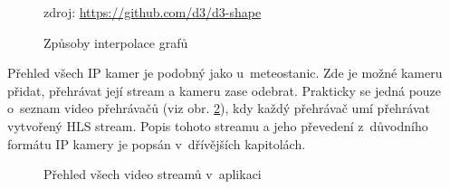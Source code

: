 \begin{figure}[h]
	\centering
	\caption{Způsoby interpolace grafů}
	\small zdroj: \url{https://github.com/d3/d3-shape}
	\label{fig:app:interpolation}
\end{figure}

Přehled všech IP kamer je podobný jako u~meteostanic. Zde je možné kameru přidat, přehrávat její stream a kameru zase odebrat. Prakticky se jedná pouze o~seznam video přehrávačů (viz obr. \ref{fig:app:cameras}), kdy každý přehrávač umí přehrávat vytvořený HLS stream. Popis tohoto streamu a jeho převedení z~důvodního formátu IP kamery je popsán v~dřívějších kapitolách.

\begin{figure}[h]
	\centering
	\caption{Přehled všech video streamů v~aplikaci}
	\label{fig:app:cameras}
\end{figure}

